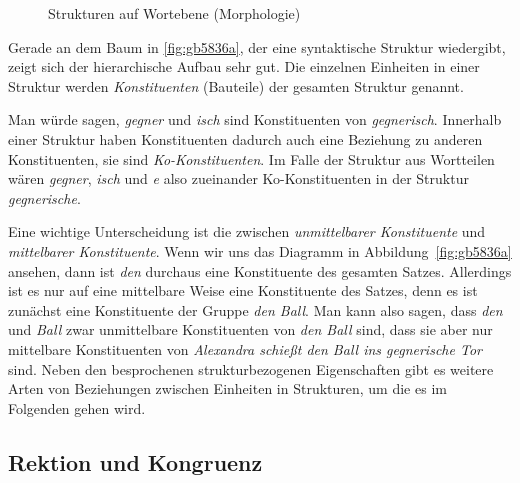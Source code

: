 \begin{figure}
  \centering
  \caption{Strukturen auf Wortebene (Morphologie)}
  \label{fig:gb5836b}
\end{figure}

Gerade an dem Baum in \ref{fig:gb5836a}, der eine syntaktische Struktur wiedergibt, zeigt sich der hierarchische Aufbau sehr gut.
Die einzelnen Einheiten in einer Struktur werden \textit{Konstituenten} (Bauteile) der gesamten Struktur genannt.


Man würde sagen, \textit{gegner} und \textit{isch} sind Konstituenten von \textit{gegnerisch}.
Innerhalb einer Struktur haben Konstituenten dadurch auch eine Beziehung zu anderen Konstituenten, sie sind \textit{Ko-Konstituenten}.
Im Falle der Struktur aus Wortteilen wären \textit{gegner}, \textit{isch} und \textit{e} also zueinander Ko-Konstituenten in der Struktur \textit{gegnerische}.


Eine wichtige Unterscheidung ist die zwischen \textit{unmittelbarer Konstituente} und \textit{mittelbarer Konstituente}.
Wenn wir uns das Diagramm in Abbildung~\ref{fig:gb5836a} ansehen, dann ist \textit{den} durchaus eine Konstituente des gesamten Satzes.
Allerdings ist es nur auf eine mittelbare Weise eine Konstituente des Satzes, denn es ist zunächst eine Konstituente der Gruppe \textit{den Ball}.
Man kann also sagen, dass \textit{den} und \textit{Ball} zwar unmittelbare Konstituenten von \textit{den Ball} sind, dass sie aber nur mittelbare Konstituenten von \textit{Alexandra schießt den Ball ins gegnerische Tor} sind.
Neben den besprochenen strukturbezogenen Eigenschaften gibt es weitere Arten von Beziehungen zwischen Einheiten in Strukturen, um die es im Folgenden gehen wird.

\subsection{Rektion und Kongruenz}

\label{sec:rektionkongruenz}

